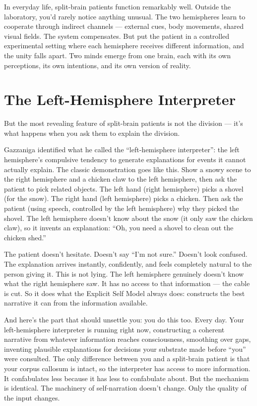 \documentclass[11pt, twoside, openright]{book}
\begin{document}
In everyday life, split-brain patients function remarkably well. Outside the laboratory, you'd rarely notice anything unusual. The two hemispheres learn to cooperate through indirect channels --- external cues, body movements, shared visual fields. The system compensates. But put the patient in a controlled experimental setting where each hemisphere receives different information, and the unity falls apart. Two minds emerge from one brain, each with its own perceptions, its own intentions, and its own version of reality.

\section*{The Left-Hemisphere Interpreter}

But the most revealing feature of split-brain patients is not the division --- it's what happens when you ask them to explain the division.

Gazzaniga identified what he called the ``left-hemisphere interpreter'': the left hemisphere's compulsive tendency to generate explanations for events it cannot actually explain. The classic demonstration goes like this. Show a snowy scene to the right hemisphere and a chicken claw to the left hemisphere, then ask the patient to pick related objects. The left hand (right hemisphere) picks a shovel (for the snow). The right hand (left hemisphere) picks a chicken. Then ask the patient (using speech, controlled by the left hemisphere) why they picked the shovel. The left hemisphere doesn't know about the snow (it only saw the chicken claw), so it invents an explanation: ``Oh, you need a shovel to clean out the chicken shed.''

The patient doesn't hesitate. Doesn't say ``I'm not sure.'' Doesn't look confused. The explanation arrives instantly, confidently, and feels completely natural to the person giving it. This is not lying. The left hemisphere genuinely doesn't know what the right hemisphere saw. It has no access to that information --- the cable is cut. So it does what the Explicit Self Model always does: constructs the best narrative it can from the information available.

And here's the part that should unsettle you: you do this too. Every day. Your left-hemisphere interpreter is running right now, constructing a coherent narrative from whatever information reaches consciousness, smoothing over gaps, inventing plausible explanations for decisions your substrate made before ``you'' were consulted. The only difference between you and a split-brain patient is that your corpus callosum is intact, so the interpreter has access to more information. It confabulates less because it has less to confabulate about. But the mechanism is identical. The machinery of self-narration doesn't change. Only the quality of the input changes.
\end{document}

